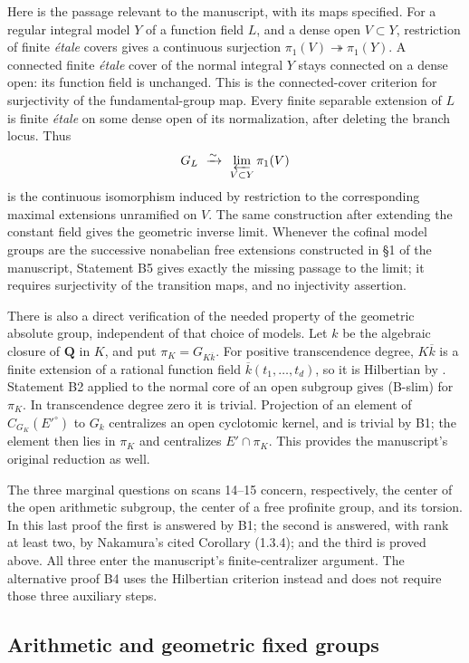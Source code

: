 Here is the passage relevant to the manuscript, with its maps specified.
For a regular integral model $Y$ of a function field $L$, and a dense open
$V\subset Y$, restriction of finite \emph{\'etale} covers gives a
continuous surjection $\pi_1(V)\twoheadrightarrow\pi_1(Y)$.
A connected finite \emph{\'etale} cover of the normal integral $Y$ stays
connected on a dense open: its function field is unchanged. This is the
connected-cover criterion for surjectivity of the fundamental-group map.
Every finite separable extension of $L$ is finite \emph{\'etale} on some
dense open of its normalization, after deleting the branch locus. Thus
\[
 G_L\ \xrightarrow{\sim}\ \varprojlim_{V\subset Y}\pi_1(V)
\]
is the continuous isomorphism induced by restriction to the corresponding
maximal extensions unramified on $V$. The same construction after extending
the constant field gives the geometric inverse limit. Whenever the cofinal
model groups are the successive nonabelian free extensions constructed in
\S1 of the manuscript, Statement B5 gives exactly the missing passage
to the limit; it requires surjectivity of the transition maps, and no
injectivity assertion.

There is also a direct verification of the needed property of the
geometric absolute group, independent of that choice of models. Let
$k$ be the algebraic closure of $\mathbf Q$ in $K$, and put
$\pi_K=G_{K\overline k}$. For positive transcendence degree,
$K\overline k$ is a finite extension of a rational function field
$\overline k(t_1,\ldots,t_d)$, so it is Hilbertian by
\cite[\S4, Theorem 2(a),(d)]{B_Geyer2012}. Statement B2 applied to the
normal core of an open subgroup gives (B-slim) for $\pi_K$. In
transcendence degree zero it is trivial. Projection of an element of
$C_{G_K}(E'^\circ)$ to $G_k$ centralizes an open cyclotomic kernel, and
is trivial by B1; the element then lies in $\pi_K$ and centralizes
$E'\cap\pi_K$. This provides the manuscript's original reduction as well.

The three marginal questions on scans 14--15 concern, respectively,
the center of the open arithmetic subgroup, the center of a free
profinite group, and its torsion. In this last proof the first is answered
by B1; the second is answered, with rank at least two, by Nakamura's cited
Corollary (1.3.4); and the third is proved above. All three enter the
manuscript's finite-centralizer argument. The alternative proof B4 uses
the Hilbertian criterion instead and does not require those three
auxiliary steps.

\subsection{Arithmetic and geometric fixed groups}


